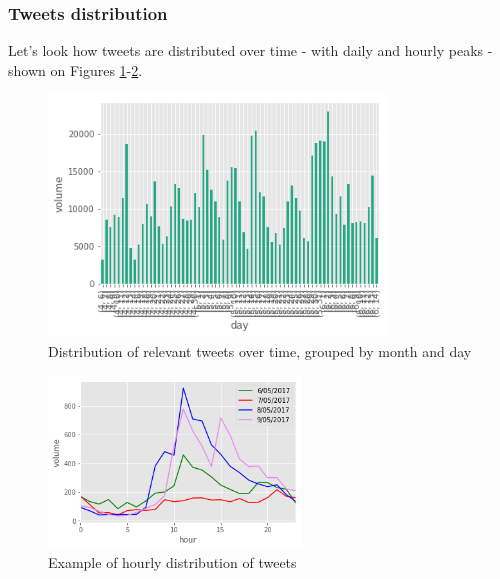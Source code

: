 \documentclass[12pt,a4paper]{article}
\begin{document}
\subsubsection{Tweets distribution}
Let's look how tweets are distributed over time - with daily and hourly peaks - shown on Figures \ref{fig:all_distr_month_day}-\ref{fig:dist_hour}.
\begin{figure}
\centering
\includegraphics[width=0.8\textwidth]{figures/all_distr_month_day.png}
\caption{Distribution of relevant tweets over time, grouped by month and day}
\label{fig:all_distr_month_day}
\end{figure}
\begin{figure}
\centering
\includegraphics[width=0.6\textwidth]{figures/distr_hour.png}
\caption{Example of hourly distribution of tweets}
\label{fig:dist_hour}
\end{figure}
\end{document}
